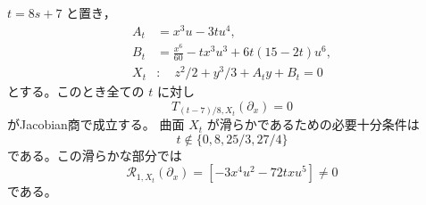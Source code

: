 \begin{proposition}[nilpotentな線型ベクトル場による零方向族]
\label{prop:ku-d1-short-null-family}
$t=8s+7$ と置き，
\begin{equation}\label{eq:ku-d1-short-null-family}
 \begin{split}
 A_t&=x^3u-3tu^4,\\
 B_t&=\frac{x^6}{60}-t x^3u^3+6t(15-2t)u^6,\\
 X_t&:\quad z^2/2+y^3/3+A_ty+B_t=0
 \end{split}
\end{equation}
とする。このとき全ての $t$ に対し
\[
                       T_{(t-7)/8,X_t}(\partial_x)=0
\]
がJacobian商で成立する。
曲面 $X_t$ が滑らかであるための必要十分条件は
\begin{equation}\label{eq:ku-d1-short-family-smooth-locus}
                         t\notin\{0,8,25/3,27/4\}
\end{equation}
である。この滑らかな部分では
\[
 \mathcal R_{1,X_t}(\partial_x)
                      =[-3x^4u^2-72t xu^5]\ne0
\]
である。
\end{proposition}
